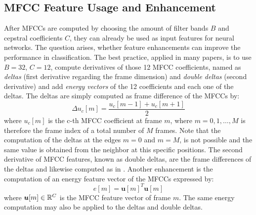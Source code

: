 
\subsection{MFCC Feature Usage and Enhancement}\label{sec:signal_mfcc_enhancement}
After MFCCs are computed by choosing the amount of filter bands $B$ and cepstral coefficients $C$, they can already be used as input features for neural networks.
The question arises, whether feature enhancements can improve the performance in classification.
The best practice, applied in many papers, is to use $B=32$, $C=12$, compute derivatives of those 12 MFCC coefficients, named as \emph{deltas} (first derivative regarding the frame dimension) and \emph{double deltas} (second derivative) and add \emph{energy vectors} of the 12 coefficients and each one of the deltas.
The deltas are simply computed as frame difference of the MFCCs by:
\begin{equation}\label{eq:signal_mfcc_delta}
  \Delta u_c[m] = \frac{u_c[m - 1] + u_c[m + 1]}{2}
\end{equation}
where $u_c[m]$ is the c-th MFCC coefficient at frame $m$, where $m = 0, 1, \dots, M$ is therefore the frame index of a total number of $M$ frames.
Note that the computation of the deltas at the edges $m=0$ and $m=M$, is not possible and the same value is obtained from the neighbor at this specific positions.
The second derivative of MFCC features, known as double deltas, are the frame differences of the deltas and likewise computed as in .
Another enhancement is the computation of an energy feature vector of the MFCCs expressed by:
\begin{equation}
  e[m] = \bm{u}[m]^T \bm{u}[m] 
\end{equation}
where $\bm{u}[m] \in \mathbb{R}^C$ is the MFCC feature vector of frame $m$.
The same energy computation may also be applied to the deltas and double deltas.

